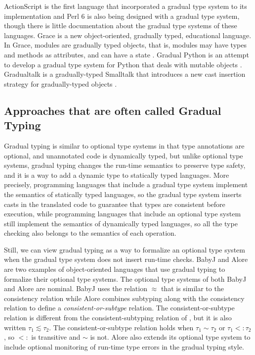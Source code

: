 \documentclass[preprint]{sig-alternate}
\begin{document}
ActionScript \citep{moock2007as3} is the first language that
incorporated a gradual type system to its implementation and
Perl 6 \citep{tang2007pri} is also being designed with a
gradual type system, though there is little documentation about
the gradual type systems of these languages.
Grace \citep{black2012grace,black2013sg} is a new object-oriented,
gradually typed, educational language.
In Grace, modules are gradually typed objects, that is, modules
may have types and methods as attributes, and can have a state
\citep{homer2013modules}.
Gradual Python \citep{reticulated} is an attempt to develop a
gradual type system for Python that deals with mutable objects
\citep{siek2013mutable}.
Gradualtalk \citep{allende2013gts} is a gradually-typed Smalltalk
that introduces a new cast insertion strategy for gradually-typed
objects \citep{allende2013cis}.

\subsection{Approaches that are often called Gradual Typing}

Gradual typing is similar to optional type systems in that type
annotations are optional, and unannotated code is dynamically
typed, but unlike optional type systems, gradual typing changes 
the run-time semantics to preserve type safety, and it is a way to
add a dynamic type to statically typed languages. 
More precisely, programming languages that include a gradual type
system implement the semantics of statically typed languages, so
the gradual type system inserts casts in the translated code to
guarantee that types are consistent before execution, while
programming languages that include an optional type system still
implement the semantics of dynamically typed languages, so all
the type checking also belongs to the semantics of each operation.

Still, we can view gradual typing as a way to formalize an optional
type system when the gradual type system does not insert run-time
checks.
BabyJ \citep{anderson2003babyj} and Alore \citep{lehtosalo2011alore}
are two examples of object-oriented languages that use gradual
typing to formalize their optional type systems.
The optional type systems of both BabyJ and Alore are nominal.
BabyJ uses the relation $\approx$ that is similar to the consistency
relation while Alore combines  subtyping along with the consistency
relation to define a \textit{consistent-or-subtype} relation.
The consistent-or-subtype relation is different from the
consistent-subtyping relation of \citet{siek2007objects}, but it is
also written $\tau_{1} \lesssim \tau_{2}$.
The consistent-or-subtype relation holds when $\tau_{1} \sim \tau_{2}$
or $\tau_{1} <: \tau_{2}$, so $<:$ is transitive and $\sim$ is not.
Alore also extends its optional type system to include optional
monitoring of run-time type errors in the gradual typing style.
\end{document}
